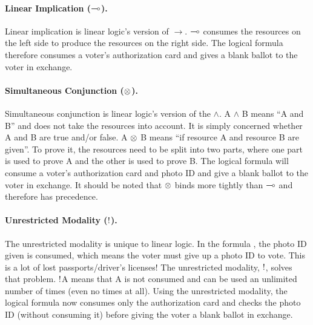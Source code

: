 \paragraph{Linear Implication ($\multimap$).} Linear implication is linear logic’s version of $\rightarrow$. $\multimap$ consumes the resources on the left side to produce the resources on the right side. The logical formula
therefore consumes a voter’s authorization card and gives a blank ballot to the voter in exchange.

\paragraph{Simultaneous Conjunction ($\otimes$).} Simultaneous conjunction is linear logic’s version of the $\wedge$. A $\wedge$ B means “A and B” and does not take the resources into account. It is simply concerned whether A and B are true and/or false. A $\otimes$ B means “if resource A and resource B are given”. To prove it, the resources need to be split into two parts, where one part is used to prove A and the other is used to prove B. The logical formula
will consume a voter’s authorization card and photo ID and give a blank ballot to the voter in exchange. It should be noted that $\otimes$ binds more tightly than $\multimap$ and therefore has precedence.

\paragraph{Unrestricted Modality ($\mathord{\text{\rm !}}$).} The unrestricted modality is unique to linear logic. In the formula , the photo ID given is consumed, which means the voter must give up a photo ID to vote. This is a lot of lost passports/driver’s licenses!
The unrestricted modality, $\mathord{\text{\rm !}}$, solves that problem. $\mathord{\text{\rm !}}$A means that A is not consumed and can be used an unlimited number of times (even no times at all). Using the unrestricted modality, the logical formula
now consumes only the authorization card and checks the photo ID (without consuming it) before giving the voter a blank ballot in exchange. 

